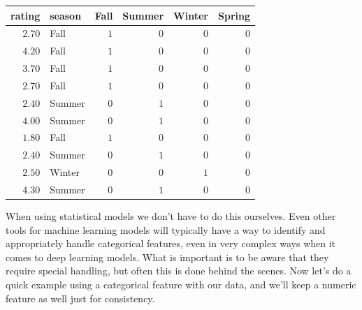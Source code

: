 \documentclass[
  letterpaper,
]{krantz}
\begin{document}
\begin{longtable*}{rlrrrr}
\toprule
rating & season & Fall & Summer & Winter & Spring \\ 
\midrule\addlinespace[2.5pt]
\textcolor[HTML]{404040}{$2.70$} & Fall & \textcolor[HTML]{404040}{$1$} & \textcolor[HTML]{404040}{$0$} & \textcolor[HTML]{404040}{$0$} & \textcolor[HTML]{404040}{$0$} \\ 
\textcolor[HTML]{404040}{$4.20$} & Fall & \textcolor[HTML]{404040}{$1$} & \textcolor[HTML]{404040}{$0$} & \textcolor[HTML]{404040}{$0$} & \textcolor[HTML]{404040}{$0$} \\ 
\textcolor[HTML]{404040}{$3.70$} & Fall & \textcolor[HTML]{404040}{$1$} & \textcolor[HTML]{404040}{$0$} & \textcolor[HTML]{404040}{$0$} & \textcolor[HTML]{404040}{$0$} \\ 
\textcolor[HTML]{404040}{$2.70$} & Fall & \textcolor[HTML]{404040}{$1$} & \textcolor[HTML]{404040}{$0$} & \textcolor[HTML]{404040}{$0$} & \textcolor[HTML]{404040}{$0$} \\ 
\textcolor[HTML]{404040}{$2.40$} & Summer & \textcolor[HTML]{404040}{$0$} & \textcolor[HTML]{404040}{$1$} & \textcolor[HTML]{404040}{$0$} & \textcolor[HTML]{404040}{$0$} \\ 
\textcolor[HTML]{404040}{$4.00$} & Summer & \textcolor[HTML]{404040}{$0$} & \textcolor[HTML]{404040}{$1$} & \textcolor[HTML]{404040}{$0$} & \textcolor[HTML]{404040}{$0$} \\ 
\textcolor[HTML]{404040}{$1.80$} & Fall & \textcolor[HTML]{404040}{$1$} & \textcolor[HTML]{404040}{$0$} & \textcolor[HTML]{404040}{$0$} & \textcolor[HTML]{404040}{$0$} \\ 
\textcolor[HTML]{404040}{$2.40$} & Summer & \textcolor[HTML]{404040}{$0$} & \textcolor[HTML]{404040}{$1$} & \textcolor[HTML]{404040}{$0$} & \textcolor[HTML]{404040}{$0$} \\ 
\textcolor[HTML]{404040}{$2.50$} & Winter & \textcolor[HTML]{404040}{$0$} & \textcolor[HTML]{404040}{$0$} & \textcolor[HTML]{404040}{$1$} & \textcolor[HTML]{404040}{$0$} \\ 
\textcolor[HTML]{404040}{$4.30$} & Summer & \textcolor[HTML]{404040}{$0$} & \textcolor[HTML]{404040}{$1$} & \textcolor[HTML]{404040}{$0$} & \textcolor[HTML]{404040}{$0$} \\ 
\bottomrule
\end{longtable*}

When using statistical models we don't have to do this ourselves. Even
other tools for machine learning models will typically have a way to
identify and appropriately handle categorical features, even in very
complex ways when it comes to deep learning models. What is important is
to be aware that they require special handling, but often this is done
behind the scenes. Now let's do a quick example using a categorical
feature with our data, and we'll keep a numeric feature as well just for
consistency.
\end{document}
